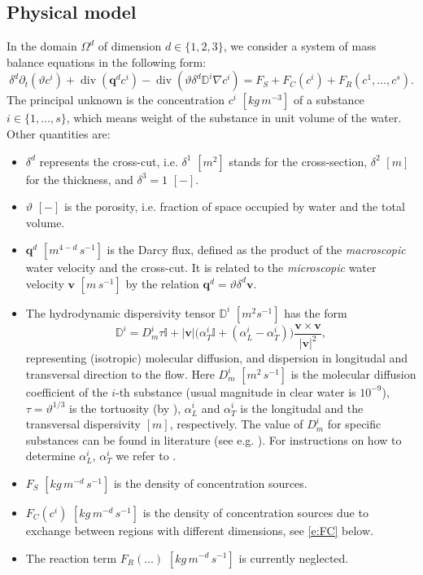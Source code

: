 \documentclass[a4paper]{article}
\def\abs#1{\lvert#1\rvert}
\def\D{{\tn D}}
\def\div{\operatorname{div}}
\def\grad{\nabla}
\def\vc#1{\mathbf{\boldsymbol{#1}}}     %
\def\th{\vartheta}
\def\tn#1{{\mathbb{#1}}}    %
\begin{document}
\subsection{Physical model}
In the domain $\Omega^d$ of dimension $d\in\{1,2,3\}$, we consider a system of mass balance equations in the following form:
\begin{equation}
    \label{e:ADE}
   \delta^d\partial_t ( \th c^i) + \div ( \vc q^d c^i ) - \div (\th \delta^d \D^i \grad c^i ) = F_S + F_C(c^i) + F_R(c^1,\dots, c^s).%
\end{equation}
The principal unknown is the concentration $c^i$ $[kg\,m^{-3}]$ of a substance $i\in\{1,\dots, s\}$, which means weight of the substance in unit volume of the water.
Other quantities are:
\begin{itemize}
\item $\delta^d$ represents the cross-cut, i.e. $\delta^1$ $[m^2]$ stands for the cross-section, $\delta^2$ $[m]$ for the thickness, and $\delta^3=1$ $[-]$.
\item $\th$ $[-]$ is the porosity, i.e. fraction of space occupied by water and the total volume.
\item $\vc q^d$ $[m^{4-d}\,s^{-1}]$ is the Darcy flux, defined as the product of the \emph{macroscopic} water velocity and the cross-cut.
It is related to the \emph{microscopic} water velocity $\vc v$ $[m\,s^{-1}]$ by the relation $\vc q^d = \th\delta^d\vc v$.
\item The hydrodynamic dispersivity tensor $\D^i$ $[m^2 s^{-1}]$ has the form
\[
  \D^i =D_m^i \tau \tn I + \abs{\vc v}\big(\alpha_T^i \tn I + (\alpha_L^i - \alpha_T^i) \big) \frac{\vc v \times \vc v}{\abs{\vc v}^2},
\]
representing (isotropic) molecular diffusion, and dispersion in longitudal and transversal direction to the flow.
Here $D_m^i$ $[m^2\,s^{-1}]$ is the molecular diffusion coefficient of the $i$-th substance (usual magnitude in clear water is $10^{-9}$), $\tau=\th^{1/3}$ is the tortuosity (by \cite{millington_quirk}), $\alpha_L^i$ and $\alpha_T^i$ is the longitudal and the transversal dispersivity $[m]$, respectively.
The value of $D_m^i$ for specific substances can be found in literature (see e.g. \cite{cislerova_vogel}).
For instructions on how to determine $\alpha_L^i$, $\alpha_T^i$ we refer to \cite{marsily,domenico_schwartz}.

\item $F_S$ $[kg\,m^{-d}\,s^{-1}]$ is the density of concentration sources.

\item $F_C(c^i)$ $[kg\, m^{-d}\,s^{-1}]$ is the density of concentration sources due to exchange between regions with different dimensions, see \eqref{e:FC} below.

\item The reaction term $F_R(\dots)$ $[kg\,m^{-d}\,s^{-1}]$ is currently neglected.
\end{itemize}
\end{document}
